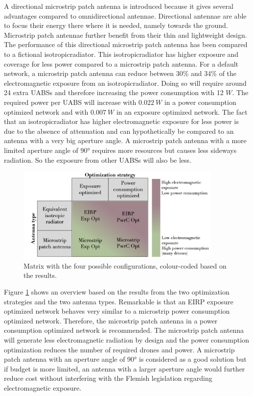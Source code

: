 A directional microstrip patch antenna is introduced because it gives several advantages compared to omnidirectional antennae.
Directional antennae are able to focus their energy there where it is needed, namely towards the ground. Microstrip patch antennae 
further benefit from their thin and lightweight design. The performance 
of this directional microstrip patch antenna has been compared to a 
fictional \gls{isotropicradiator}.
This \gls{isotropicradiator} has higher exposure and coverage for less power compared to a microstrip patch antenna.
For a default network, a microstrip patch antenna can reduce between 30\% and 34\% of the electromagnetic exposure 
from an \gls{isotropicradiator}. Doing so will require around 24 extra \gls{UABS}s and therefore increasing the power consumption with 12 $W$.
The required power per \gls{UABS} will increase with $0.022\ W$ 
in a power consumption optimized network and with $0.007\ W$ in an exposure optimized network.
The fact that an \gls{isotropicradiator} has higher electromagnetic exposure for less power  is due to the absence of 
attenuation and can hypothetically be compared to an antenna with a very big aperture angle.
A microstrip patch antenna with a more limited aperture angle of \ang{90} requires more resources but 
causes less sideways radiation. So the exposure from other \gls{UABS}s will also be less.

\begin{figure}[hb!]
\centering
  \includegraphics[width=0.9\textwidth]{../images/fourCasesMatrixSol.png}
  \caption{Matrix with the four possible configurations, colour-coded based on the results.}
  \label{fig:resultIllustration}
\end{figure}

Figure \ref{fig:resultIllustration} shows an overview based on the results from the two optimization strategies and the two antenna types.
Remarkable is that an \gls{EIRP} exposure optimized network behaves very similar to a microstrip power consumption optimized network.
Therefore, the microstrip patch antenna in a power consumption optimized network is recommended. 
The microstrip patch antenna will generate less electromagnetic radiation by design and
 the power consumption optimization reduces the number of required drones and power. A microstrip patch antenna with an aperture 
 angle of \ang{90} is considered as a good solution but if budget is more limited, an antenna with a larger aperture angle 
 would further reduce cost without interfering with the Flemish legislation regarding electromagnetic exposure.


